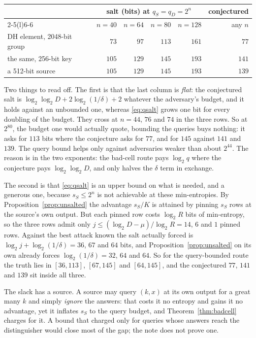 \documentclass{aicr-solution}
\begin{document}
\begin{center}\small
\begin{tabular}{@{}lrrrrr@{}}
\toprule
 & \multicolumn{4}{c}{salt (bits) at $q_S = q_D = 2^{n}$} & conjectured \\
\cmidrule(lr){2-5}\cmidrule(l){6-6}
 & $n = 40$ & $n = 64$ & $n = 80$ & $n = 128$ & any $n$ \\
\midrule
DH element, 2048-bit group & $73$  & $97$  & $113$ & $161$ & $77$  \\
the same, 256-bit key      & $105$ & $129$ & $145$ & $193$ & $141$ \\
a 512-bit source           & $105$ & $129$ & $145$ & $193$ & $139$ \\
\bottomrule
\end{tabular}
\end{center}

Two things to read off. The first is that the last column is \emph{flat}: the conjectured salt is
$\log_2\log_2 D + 2\log_2(1/\delta) + 2$ whatever the adversary's budget, and it holds against an
unbounded one, whereas \eqref{eq:qsalt} grows one bit for every doubling of the budget. They cross
at $n = 44$, $76$ and $74$ in the three rows. So at $2^{80}$, the budget one would actually quote,
bounding the queries buys nothing: it asks for $113$ bits where the conjecture asks for $77$, and
for $145$ against $141$ and $139$. The query bound helps only against adversaries weaker than about
$2^{44}$. The reason is in the two exponents: the bad-cell route pays $\log_2 q$ where the
conjecture pays $\log_2\log_2 D$, and only halves the $\delta$ term in exchange.

The second is that \eqref{eq:qsalt} is an upper bound on what is needed, and a generous one, because
$s_S \le 2^{n}$ is not achievable at these min-entropies. By Proposition~\ref{prop:unsalted} the
advantage $s_S/K$ is attained by pinning $s_S$ rows at the source's own output. But each pinned row
costs $\log_2 R$ bits of min-entropy, so the three rows admit only
$j \le (\log_2 D - \mu)/\log_2 R = 14$, $6$ and $1$ pinned rows. Against the best attack known the
salt actually forced is $\log_2 j + \log_2(1/\delta) = 36$, $67$ and $64$ bits, and
Proposition~\ref{prop:unsalted} on its own already forces $\log_2(1/\delta) = 32$, $64$ and $64$. So
for the query-bounded route the truth lies in $[36,113]$, $[67,145]$ and $[64,145]$, and the
conjectured $77$, $141$ and $139$ sit inside all three.

The slack has a source. A source may query $(k,x)$ at its own output for a great many $k$ and simply \emph{ignore} the
answers: that costs it no entropy and gains it no advantage, yet it inflates $s_S$ to the query
budget, and Theorem~\ref{thm:badcell} charges for it. A bound that charged only for queries whose
answers reach the distinguisher would close most of the gap; the note does not prove one.
\end{document}
